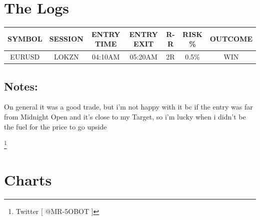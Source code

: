 \documentclass{article}
\begin{document}
\section{The Logs}
\vspace{0.3cm}

\renewcommand{\arraystretch}{1.5} %
\setlength{\tabcolsep}{10pt} %

\begin{center}
\begin{tabular}{|c|c|c|c|c|c|c|}
  \hline
  SYMBOL & SESSION & ENTRY TIME & ENTRY EXIT & R-R & RISK \% & OUTCOME \\ 
  \hline 
  EURUSD & LOKZN & 04:10AM & 05:20AM & 2R & 0.5\% & WIN \\  
  \hline
\end{tabular}
\end{center}
\vspace{0.1cm}

\begin{notebox}
\subsection{Notes:}

\begin{notesbox}
\noindent On general it was a good trade, but i'm not happy with it bc if the entry was far from Midnight Open and it's close to my Target, so i'm lucky when i didn't be the fuel for the price to go upside
\end{notesbox}
\end{notebox}

\footnote{Twitter [ @MR-5OBOT ]}
\newpage

\vspace{0.4cm}

\section{Charts}
\end{document}
